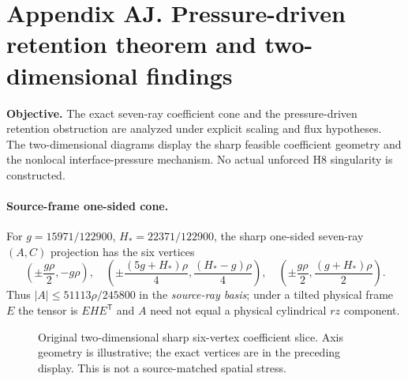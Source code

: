 \clearpage
\section*{Appendix AJ. Pressure-driven retention theorem and two-dimensional findings}
\noindent\textbf{Objective.} The exact seven-ray coefficient cone and the pressure-driven retention obstruction are analyzed under explicit scaling and flux hypotheses. The two-dimensional diagrams display the sharp feasible coefficient geometry and the nonlocal interface-pressure mechanism. No actual unforced H8 singularity is constructed.

\paragraph{Source-frame one-sided cone.}
For $g=15971/122900$, $H_*=22371/122900$, the sharp one-sided seven-ray $(A,C)$ projection has the six vertices
\[
\left(\pm\frac{g\rho}{2},-g\rho\right),\quad
\left(\pm\frac{(5g+H_*)\rho}{4},\frac{(H_*-g)\rho}{4}\right),\quad
\left(\pm\frac{g\rho}{2},\frac{(g+H_*)\rho}{2}\right).
\]
Thus $|A|\le51113\rho/245800$ in the \emph{source-ray basis}; under a tilted physical frame $E$ the tensor is $EHE^{\mathsf T}$ and $A$ need not equal a physical cylindrical $rz$ component.

\begin{figure}[htbp]\centering
{}
\caption{Original two-dimensional sharp six-vertex coefficient slice. Axis geometry is illustrative; the exact vertices are in the preceding display. This is not a source-matched spatial stress.}
\end{figure}

